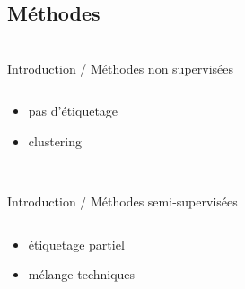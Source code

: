 \subsection{Méthodes}
\begin{frame}{\bititle\\Introduction / Méthodes non supervisées}
\begin{columns}\begin{column}{.5\textwidth}

\begin{itemize}
\item<1-> pas d’étiquetage
\item<2-> clustering
\end{itemize}

\end{column}\begin{column}{.5\textwidth}


\end{column}\end{columns}
\end{frame}
\begin{frame}{\bititle\\Introduction / Méthodes semi-supervisées}
\begin{columns}\begin{column}{.5\textwidth}

\begin{itemize}
\item<1-> étiquetage partiel
\item<2-> mélange techniques
\end{itemize}

\end{column}\begin{column}{.5\textwidth}


\end{column}\end{columns}
\end{frame}
